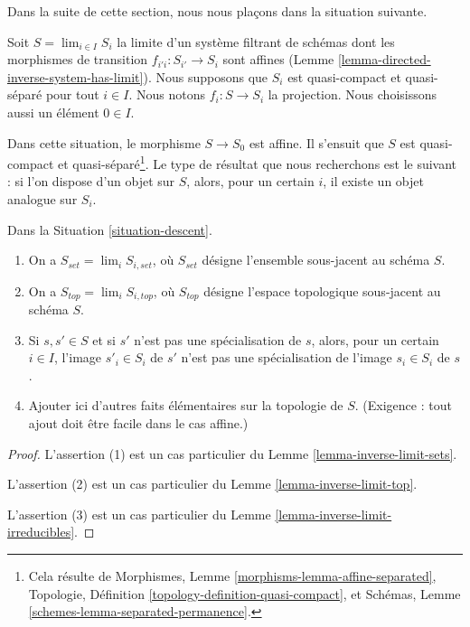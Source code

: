 \noindent
Dans la suite de cette section, nous nous plaçons dans la situation suivante.

\begin{situation}
\label{situation-descent}
Soit $S = \lim_{i \in I} S_i$ la limite d'un système filtrant de schémas
dont les morphismes de transition $f_{i'i} : S_{i'} \to S_i$ sont affines
(Lemme \ref{lemma-directed-inverse-system-has-limit}). Nous supposons que
$S_i$ est quasi-compact et quasi-séparé pour tout $i \in I$. Nous notons
$f_i : S \to S_i$ la projection. Nous choisissons aussi un élément
$0 \in I$.
\end{situation}

\noindent
Dans cette situation, le morphisme $S \to S_0$ est affine. Il s'ensuit que
$S$ est quasi-compact et quasi-séparé\footnote{Cela résulte de Morphismes,
Lemme \ref{morphisms-lemma-affine-separated}, Topologie,
Définition \ref{topology-definition-quasi-compact}, et Schémas,
Lemme \ref{schemes-lemma-separated-permanence}.}. Le type de résultat que
nous recherchons est le suivant : si l'on dispose d'un objet sur $S$, alors,
pour un certain $i$, il existe un objet analogue sur $S_i$.

\begin{lemma}
\label{lemma-topology-limit}
Dans la Situation \ref{situation-descent}.
\begin{enumerate}
\item On a $S_{set} = \lim_i S_{i, set}$, où $S_{set}$ désigne l'ensemble
sous-jacent au schéma $S$.
\item On a $S_{top} = \lim_i S_{i, top}$, où $S_{top}$ désigne l'espace
topologique sous-jacent au schéma $S$.
\item Si $s, s' \in S$ et si $s'$ n'est pas une spécialisation de $s$,
alors, pour un certain $i \in I$, l'image $s'_i \in S_i$ de $s'$ n'est pas
une spécialisation de l'image $s_i \in S_i$ de $s$.
\item Ajouter ici d'autres faits élémentaires sur la topologie de $S$.
(Exigence : tout ajout doit être facile dans le cas affine.)
\end{enumerate}
\end{lemma}

\begin{proof}
L'assertion (1) est un cas particulier du Lemme \ref{lemma-inverse-limit-sets}.

\medskip\noindent
L'assertion (2) est un cas particulier du Lemme \ref{lemma-inverse-limit-top}.

\medskip\noindent
L'assertion (3) est un cas particulier du
Lemme \ref{lemma-inverse-limit-irreducibles}.
\end{proof}


